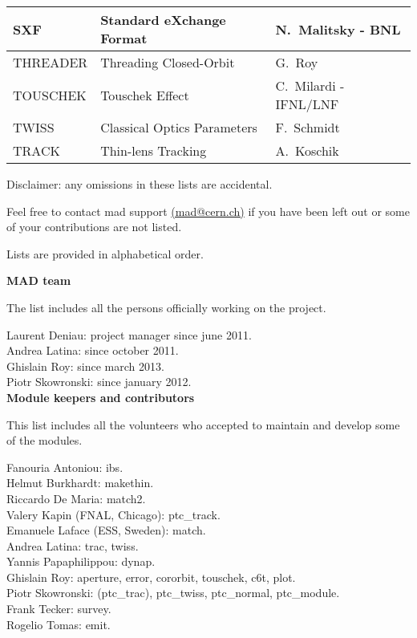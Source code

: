 \begin{table}[H]
\begin{center}
\begin{tabular}{|l|l|l|}
      SXF                &Standard eXchange Format    &N.~Malitsky - BNL  \\\hline
      THREADER           &Threading Closed-Orbit      &G.~Roy \\\hline
      TOUSCHEK           &Touschek Effect             &C.~Milardi - IFNL/LNF \\\hline
      TWISS              &Classical Optics Parameters &F.~Schmidt \\\hline
      TRACK              &Thin-lens Tracking          &A.~Koschik \\\hline      
    \end{tabular}
    \label{Module_Keepers}
  \end{center}
\end{table}


Disclaimer: any omissions in these lists are accidental. 

Feel free to contact mad support
\href{mailto:mad.support@cern.ch}{(mad@cern.ch)} 
if you have been left out or some of your contributions are not listed. 

Lists are provided in alphabetical order.

{\bf MAD team}

The list includes all the persons officially working on the \madx project.

Laurent Deniau: project manager since june 2011.\\
Andrea Latina: since october 2011.\\
Ghislain Roy: since march 2013.\\
Piotr Skowronski: since january 2012.\\


{\bf Module keepers and contributors}

This list includes all the volunteers who accepted to maintain and
develop some of the \madx modules.

Fanouria Antoniou: ibs.\\
Helmut Burkhardt: makethin.\\
Riccardo De Maria: match2.\\
Valery Kapin (FNAL, Chicago): ptc\_track.\\
Emanuele Laface (ESS, Sweden): match.\\
Andrea Latina: trac, twiss.\\
Yannis Papaphilippou: dynap.\\
Ghislain Roy: aperture, error, cororbit, touschek, c6t, plot.\\
Piotr Skowronski: (ptc\_trac), ptc\_twiss, ptc\_normal, ptc\_module.\\
Frank Tecker: survey.\\
Rogelio Tomas: emit.

